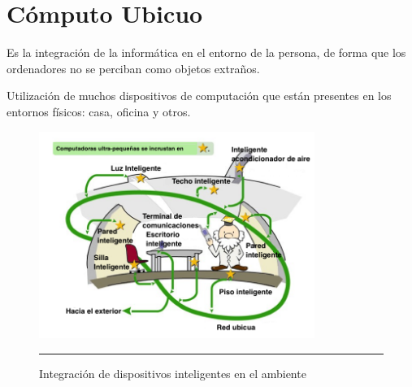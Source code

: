 \section{Cómputo Ubicuo}

Es la integración de la informática en el entorno de la persona, de forma que los ordenadores no se perciban como objetos extraños.

Utilización de muchos dispositivos de computación que están presentes en los entornos físicos: casa, oficina y otros.

\begin{figure}[h!]
	\centering
		\includegraphics[width=0.8\textwidth]{Figuras/ubicuo.png}
		\rule{35em}{0.5pt}
	\caption[Integración de dispositivos inteligentes en el ambiente]{Integración de dispositivos inteligentes en el ambiente \cite{ubicuo}}
	\label{fig:ubicuo}
\end{figure}
